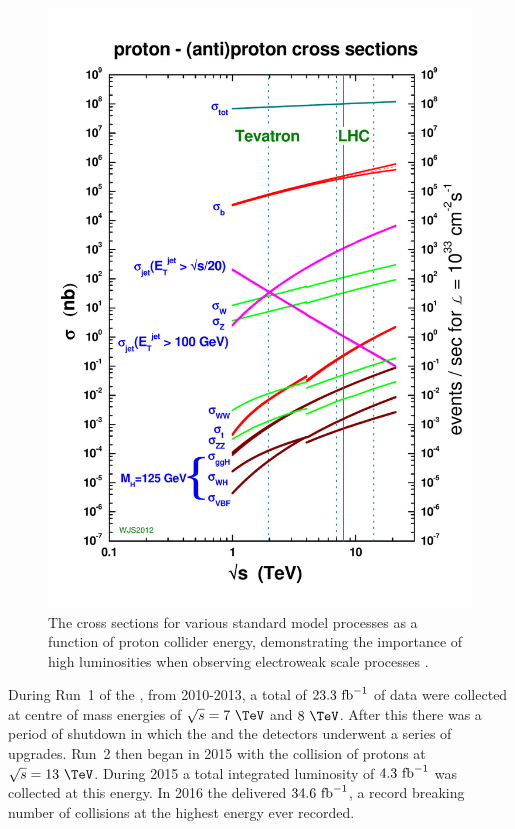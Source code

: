 \begin{figure}
  \includegraphics[width=\mediumfigwidth]{figs/crosssections2012_v5}
  \caption[]%
  { The cross sections for various standard model processes as a
  function of proton collider energy, demonstrating the importance of
  high luminosities when observing electroweak scale processes
  \cite{stirlingCrossSec1}.}%
  \label{fig:xsecs}
\end{figure}

During Run~1 of the \LHC, from 2010-2013, a total of $23.3~\text{fb}^{-1}$ of
data were collected at centre of mass energies of $\sqrt{s}=7~\tev$ and
$8~\tev$. After this there was a period of shutdown in which the \LHC
and the detectors underwent a series of upgrades. Run~2 then began in
2015 with the collision of protons at $\sqrt{s}=13~\tev$. During 2015 a
total integrated luminosity of $4.3~\text{fb}^{-1}$ was collected at this energy. In 2016 the
\LHC delivered $34.6~\text{fb}^{-1}$, a record breaking number of collisions
at the highest energy ever recorded. 


